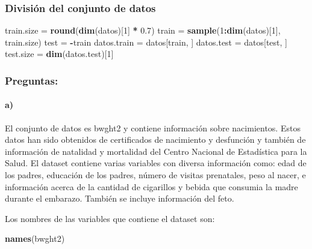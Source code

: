 \documentclass[]{article}
\newenvironment{Shaded}{\begin{snugshade}}{\end{snugshade}}
\newcommand{\KeywordTok}[1]{\textcolor[rgb]{0.13,0.29,0.53}{\textbf{#1}}}
\newcommand{\DecValTok}[1]{\textcolor[rgb]{0.00,0.00,0.81}{#1}}
\newcommand{\FloatTok}[1]{\textcolor[rgb]{0.00,0.00,0.81}{#1}}
\newcommand{\StringTok}[1]{\textcolor[rgb]{0.31,0.60,0.02}{#1}}
\newcommand{\OperatorTok}[1]{\textcolor[rgb]{0.81,0.36,0.00}{\textbf{#1}}}
\newcommand{\NormalTok}[1]{#1}
\let\oldparagraph\paragraph
\renewcommand{\paragraph}[1]{\oldparagraph{#1}\mbox{}}
\begin{document}
\subsubsection{División del conjunto de
datos}\label{division-del-conjunto-de-datos}

\begin{Shaded}
\begin{Highlighting}[]
\NormalTok{train.size =}\StringTok{ }\KeywordTok{round}\NormalTok{(}\KeywordTok{dim}\NormalTok{(datos)[}\DecValTok{1}\NormalTok{] }\OperatorTok{*}\StringTok{ }\FloatTok{0.7}\NormalTok{)}
\NormalTok{train =}\StringTok{ }\KeywordTok{sample}\NormalTok{(}\DecValTok{1}\OperatorTok{:}\KeywordTok{dim}\NormalTok{(datos)[}\DecValTok{1}\NormalTok{], train.size)}
\NormalTok{test =}\StringTok{ }\OperatorTok{-}\NormalTok{train}
\NormalTok{datos.train =}\StringTok{ }\NormalTok{datos[train, ]}
\NormalTok{datos.test =}\StringTok{ }\NormalTok{datos[test, ]}
\NormalTok{test.size =}\StringTok{ }\KeywordTok{dim}\NormalTok{(datos.test)[}\DecValTok{1}\NormalTok{]}
\end{Highlighting}
\end{Shaded}

\subsubsection{Preguntas:}\label{preguntas}

\paragraph{a)}\label{a}

El conjunto de datos es bwght2 y contiene información sobre nacimientos.
Estos datos han sido obtenidos de certificados de nacimiento y
desfunción y también de información de natalidad y mortalidad del Centro
Nacional de Estadística para la Salud. El dataset contiene varias
variables con diversa información como: edad de los padres, educación de
los padres, número de visitas prenatales, peso al nacer, e información
acerca de la cantidad de cigarillos y bebida que consumia la madre
durante el embarazo. También se incluye información del feto.

Los nombres de las variables que contiene el dataset son:

\begin{Shaded}
\begin{Highlighting}[]
\KeywordTok{names}\NormalTok{(bwght2)}
\end{Highlighting}
\end{Shaded}
\end{document}
